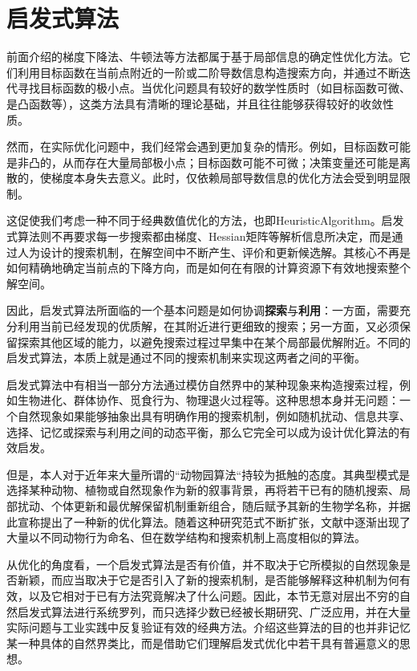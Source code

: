 \section{启发式算法}
前面介绍的梯度下降法、牛顿法等方法都属于基于局部信息的确定性优化方法。它们利用目标函数在当前点附近的一阶或二阶导数信息构造搜索方向，并通过不断迭代寻找目标函数的极小点。当优化问题具有较好的数学性质时（如目标函数可微、是凸函数等），这类方法具有清晰的理论基础，并且往往能够获得较好的收敛性质。\par
然而，在实际优化问题中，我们经常会遇到更加复杂的情形。例如，目标函数可能是非凸的，从而存在大量局部极小点；目标函数可能不可微；决策变量还可能是离散的，使梯度本身失去意义。此时，仅依赖局部导数信息的优化方法会受到明显限制。\par
这促使我们考虑一种不同于经典数值优化的方法，也即\gls{HeuristicAlgorithm}。启发式算法则不再要求每一步搜索都由梯度、Hessian矩阵等解析信息所决定，而是通过人为设计的搜索机制，在解空间中不断产生、评价和更新候选解。其核心不再是如何精确地确定当前点的下降方向，而是如何在有限的计算资源下有效地搜索整个解空间。\par
因此，启发式算法所面临的一个基本问题是如何协调\textbf{探索}与\textbf{利用}：一方面，需要充分利用当前已经发现的优质解，在其附近进行更细致的搜索；另一方面，又必须保留探索其他区域的能力，以避免搜索过程过早集中在某个局部最优解附近。不同的启发式算法，本质上就是通过不同的搜索机制来实现这两者之间的平衡。
\begin{note}
	启发式算法中有相当一部分方法通过模仿自然界中的某种现象来构造搜索过程，例如生物进化、群体协作、觅食行为、物理退火过程等。这种思想本身并无问题：一个自然现象如果能够抽象出具有明确作用的搜索机制，例如随机扰动、信息共享、选择、记忆或探索与利用之间的动态平衡，那么它完全可以成为设计优化算法的有效启发。\par
	但是，本人对于近年来大量所谓的“动物园算法“持较为抵触的态度。其典型模式是选择某种动物、植物或自然现象作为新的叙事背景，再将若干已有的随机搜索、局部扰动、个体更新和最优解保留机制重新组合，随后赋予其新的生物学名称，并据此宣称提出了一种新的优化算法。随着这种研究范式不断扩张，文献中逐渐出现了大量以不同动物行为命名、但在数学结构和搜索机制上高度相似的算法。\par
	从优化的角度看，一个启发式算法是否有价值，并不取决于它所模拟的自然现象是否新颖，而应当取决于它是否引入了新的搜索机制，是否能够解释这种机制为何有效，以及它相对于已有方法究竟解决了什么问题。因此，本节无意对层出不穷的自然启发式算法进行系统罗列，而只选择少数已经被长期研究、广泛应用，并在大量实际问题与工业实践中反复验证有效的经典方法。介绍这些算法的目的也并非记忆某一种具体的自然界类比，而是借助它们理解启发式优化中若干具有普遍意义的思想。
\end{note}

